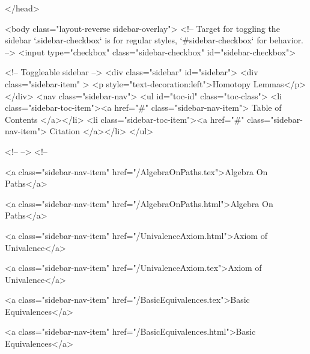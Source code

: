   
</head>




  <body class="layout-reverse sidebar-overlay">
    <!-- Target for toggling the sidebar `.sidebar-checkbox` is for regular
     styles, `#sidebar-checkbox` for behavior. -->
<input type="checkbox" class="sidebar-checkbox" id="sidebar-checkbox">

<!-- Toggleable sidebar -->
<div class="sidebar" id="sidebar">
  <div class="sidebar-item" >
    <p style="text-decoration:left">Homotopy Lemmas</p>
  </div>
  <nav class="sidebar-nav">
    <ul id="toc-id" class="toc-class">
  <li class="sidebar-toc-item"><a href="#" class="sidebar-nav-item"> Table of Contents </a></li>
  <li class="sidebar-toc-item"><a href="#" class="sidebar-nav-item"> Citation </a></li>
</ul>


    <!--  -->
    <!-- 
      
    
      
    
      
    
      
    
      
        
      
    
      
        
          <a class="sidebar-nav-item" href="/AlgebraOnPaths.tex">Algebra On Paths</a>
        
      
    
      
        
          <a class="sidebar-nav-item" href="/AlgebraOnPaths.html">Algebra On Paths</a>
        
      
    
      
        
          <a class="sidebar-nav-item" href="/UnivalenceAxiom.html">Axiom of Univalence</a>
        
      
    
      
        
          <a class="sidebar-nav-item" href="/UnivalenceAxiom.tex">Axiom of Univalence</a>
        
      
    
      
        
          <a class="sidebar-nav-item" href="/BasicEquivalences.tex">Basic Equivalences</a>
        
      
    
      
        
          <a class="sidebar-nav-item" href="/BasicEquivalences.html">Basic Equivalences</a>
        
